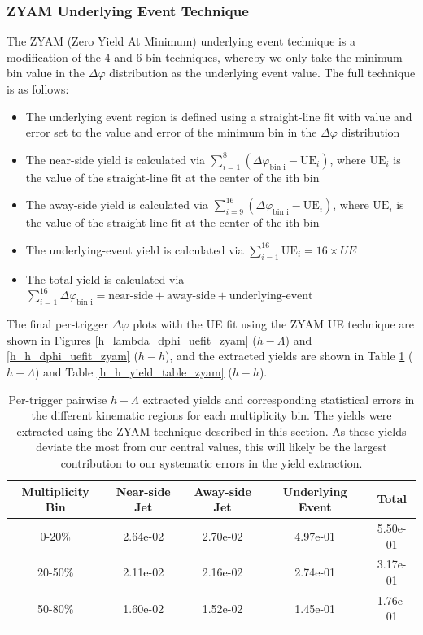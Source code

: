 \documentclass[ALICE,manyauthors]{ALICE_analysis_notes}
\begin{document}
\clearpage




\subsubsection{ZYAM Underlying Event Technique}
\label{zyam}
The ZYAM (Zero Yield At Minimum) underlying event technique is a modification of the 4 and 6 bin techniques, whereby we only take the minimum bin value in the $\Delta\varphi$ distribution as the underlying event value. The full technique is as follows:

\begin{itemize}
\item The underlying event region is defined using a straight-line fit with value and error set to the value and error of the minimum bin in the $\Delta\varphi$ distribution
\item The near-side yield is calculated via $\sum_{i=1}^{8} (\Delta\varphi_\text{bin i} - \text{UE}_i)$, where $\text{UE}_i$ is the value of the straight-line fit at the center of the ith bin
\item The away-side yield is calculated via $\sum_{i=9}^{16} (\Delta\varphi_\text{bin i} - \text{UE}_i)$, where $\text{UE}_i$ is the value of the straight-line fit at the center of the ith bin
\item The underlying-event yield is calculated via $\sum_{i=1}^{16} \text{UE}_i = 16 \times UE$
\item The total-yield is calculated via $\sum_{i=1}^{16} \Delta\varphi_\text{bin i} = \text{near-side} + \text{away-side} + \text{underlying-event}$
\end{itemize}

The final per-trigger $\Delta\varphi$ plots with the UE fit using the ZYAM UE technique are shown in Figures \ref{h_lambda_dphi_uefit_zyam} ($h-\Lambda$) and \ref{h_h_dphi_uefit_zyam} ($h-h$), and the extracted yields are shown in Table \ref{h_lambda_yield_table_zyam} ($h-\Lambda$) and Table \ref{h_h_yield_table_zyam} ($h-h$).

\begin{table}[h!]
\centering
\begin{tabular}{| c | c | c | c | c | }
\hline
Multiplicity Bin & Near-side Jet & Away-side Jet & Underlying Event & Total  \\
\hline
	
0-20\% & 2.64e-02  & 2.70e-02  & 4.97e-01 & 5.50e-01 \\
20-50\% & 2.11e-02 & 2.16e-02  & 2.74e-01 & 3.17e-01 \\
50-80\% & 1.60e-02 & 1.52e-02  & 1.45e-01 & 1.76e-01 \\
	
\hline
\end{tabular}
\caption{Per-trigger pairwise $h-\Lambda$ extracted yields and corresponding statistical errors in the different kinematic regions for each multiplicity bin. The yields were extracted using the ZYAM technique described in this section. As these yields deviate the most from our central values, this will likely be the largest contribution to our systematic errors in the yield extraction.}
\label{h_lambda_yield_table_zyam}
\end{table}
	
\end{document}
